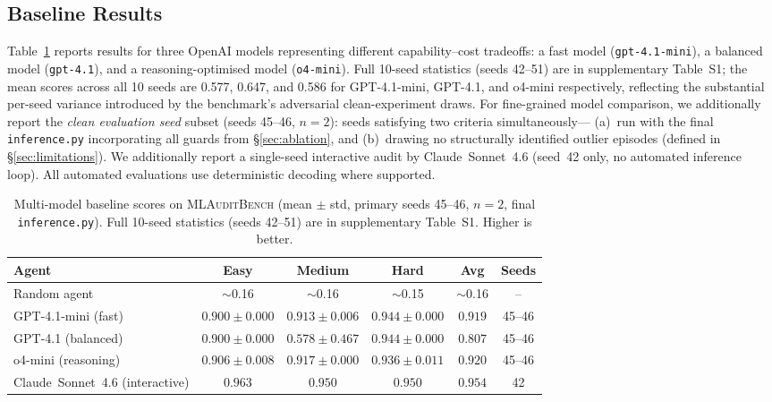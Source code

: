 \documentclass{article}
\begin{document}
\subsection{Baseline Results}

Table~\ref{tab:baseline} reports results for three OpenAI models representing
different capability--cost tradeoffs: a fast model (\texttt{gpt-4.1-mini}), a balanced
model (\texttt{gpt-4.1}), and a reasoning-optimised model (\texttt{o4-mini}).
Full 10-seed statistics (seeds 42--51) are in supplementary Table~S1; the mean
scores across all 10 seeds are 0.577, 0.647, and 0.586 for GPT-4.1-mini, GPT-4.1,
and o4-mini respectively, reflecting the substantial per-seed variance introduced by
the benchmark's adversarial clean-experiment draws.
For fine-grained model comparison, we additionally report the \emph{clean evaluation
seed} subset (seeds 45--46, $n{=}2$): seeds satisfying two criteria simultaneously---
(a)~run with the final \texttt{inference.py} incorporating all guards from
\S\ref{sec:ablation}, and (b)~drawing no structurally identified outlier episodes
(defined in \S\ref{sec:limitations}).
We additionally report a single-seed interactive audit by Claude~Sonnet~4.6
(seed~42 only, no automated inference loop).
All automated evaluations use deterministic decoding where supported.

\begin{table}[h]
\centering
\caption{Multi-model baseline scores on \textsc{MLAuditBench}
(mean $\pm$ std, primary seeds 45--46, $n{=}2$, final \texttt{inference.py}).
Full 10-seed statistics (seeds 42--51) are in supplementary Table~S1.
Higher is better.}
\label{tab:baseline}
\begin{tabular}{lccccc}
\toprule
\textbf{Agent} & \textbf{Easy} & \textbf{Medium} & \textbf{Hard} & \textbf{Avg} & \textbf{Seeds} \\
\midrule
Random agent        & $\sim$0.16 & $\sim$0.16 & $\sim$0.15 & $\sim$0.16 & -- \\
GPT-4.1-mini (fast) & $0.900\pm0.000$ & $0.913\pm0.006$ & $0.944\pm0.000$ & $0.919$ & 45--46 \\
GPT-4.1 (balanced)  & $0.900\pm0.000$ & $0.578\pm0.467$ & $0.944\pm0.000$ & $0.807$ & 45--46 \\
o4-mini (reasoning) & $0.906\pm0.008$ & $0.917\pm0.000$ & $0.936\pm0.011$ & $0.920$ & 45--46 \\
Claude~Sonnet~4.6 (interactive) & $0.963$ & $0.950$ & $0.950$ & $0.954$ & 42 \\
\bottomrule
\end{tabular}
\end{table}
\end{document}
